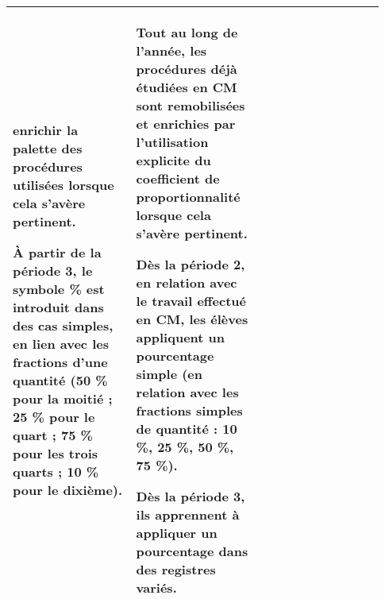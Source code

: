 {\begin{tabular}{|p{0.31\linewidth}|p{0.31\linewidth}|p{0.31\linewidth}|}
enrichir la palette des procédures utilisées lorsque
cela s’avère pertinent.\par\vspace{0.25cm}
À partir de la \textbf{période 3}, le symbole \% est introduit
dans des cas simples, en lien avec les fractions d’une 
quantité (50 \% pour la moitié ; 25 \% pour le quart ;
75 \% pour les trois quarts ; 10 \% pour le dixième).
&
Tout au long de l’année, les procédures déjà
étudiées en CM sont remobilisées et enrichies par
l’utilisation explicite du coefficient de
proportionnalité lorsque cela s’avère pertinent.\par\vspace{0.25cm}
Dès la \textbf{période 2}, en relation avec le travail effectué
en CM, les élèves appliquent un pourcentage
simple (en relation avec les fractions simples de
quantité : 10 \%, 25 \%, 50 \%, 75 \%).\par\vspace{0.25cm}
Dès la \textbf{période 3}, ils apprennent à appliquer un
pourcentage dans des registres variés.
\\\hline
\end{tabular}
\renewcommand{\arraystretch}{1}
}